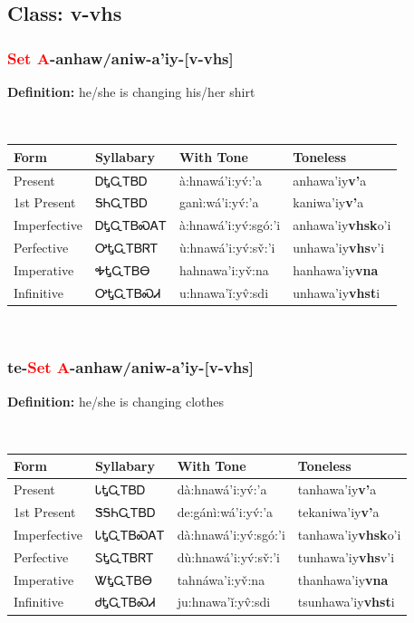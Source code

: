 \subsection*{Class: v-vhs}
\nopagebreak
\needspace{2in}
\subsubsection*{\textcolor{Red}{Set A}{-}\textbf{anhaw/aniw}{-}a'iy{-}[v-vhs]}
\nopagebreak
\textbf{Definition: } he/she is changing his/her shirt
\\[0.5em]
\begin{tabularx}{\textwidth}{l X X X}%
\toprule%
\textbf{Form}&\textbf{Syllabary}&\textbf{With Tone}&\textbf{Toneless}\\%
\midrule%
Present&ᎠᎿᏩᎢᏴᎠ&à:hnawá’i:yv́:’a&anhawa'iy\textbf{v'}a\\%
1st Present&ᎦᏂᏩᎢᏴᎠ&ganì:wá’i:yv́:’a&kaniwa'iy\textbf{v'}a\\%
Imperfective&ᎠᎿᏩᎢᏴᏍᎪᎢ&à:hnawá’i:yv́:sgó:’i&anhawa'iy\textbf{vhsk}o'i\\%
Perfective&ᎤᎿᏩᎢᏴᏒᎢ&ù:hnawá’i:yv́:sv̌:’i&unhawa'iy\textbf{vhs}v'i\\%
Imperative&ᎭᎿᏩᎢᏴᎾ&hahnawa’i:yv̌:na&hanhawa'iy\textbf{vna}\\%
Infinitive&ᎤᎿᏩᎢᏴᏍᏗ&u:hnawa’ǐ:yv̂:sdi&unhawa'iy\textbf{vhst}i\\%
\bottomrule%
\end{tabularx}
\\[1em]
\needspace{2in}
\subsubsection*{te{-}\textcolor{Red}{Set A}{-}\textbf{anhaw/aniw}{-}a'iy{-}[v-vhs]}
\nopagebreak
\textbf{Definition: } he/she is changing clothes
\\[0.5em]
\begin{tabularx}{\textwidth}{l X X X}%
\toprule%
\textbf{Form}&\textbf{Syllabary}&\textbf{With Tone}&\textbf{Toneless}\\%
\midrule%
Present&ᏓᎿᏩᎢᏴᎠ&dà:hnawá’i:yv́:’a&tanhawa'iy\textbf{v'}a\\%
1st Present&ᏕᎦᏂᏩᎢᏴᎠ&de:gánì:wá’i:yv́:’a&tekaniwa'iy\textbf{v'}a\\%
Imperfective&ᏓᎿᏩᎢᏴᏍᎪᎢ&dà:hnawá’i:yv́:sgó:’i&tanhawa'iy\textbf{vhsk}o'i\\%
Perfective&ᏚᎿᏩᎢᏴᏒᎢ&dù:hnawá’i:yv́:sv̌:’i&tunhawa'iy\textbf{vhs}v'i\\%
Imperative&ᏔᎿᏩᎢᏴᎾ&tahnáwa’i:yv̌:na&thanhawa'iy\textbf{vna}\\%
Infinitive&ᏧᎿᏩᎢᏴᏍᏗ&ju:hnawa’ǐ:yv̂:sdi&tsunhawa'iy\textbf{vhst}i\\%
\bottomrule%
\end{tabularx}
\\[1em]